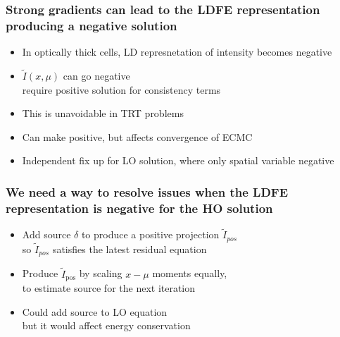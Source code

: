 \documentclass[xcolor=dvipsnames,hyperref={pdfpagelabels=false},unknownkeysallowed]{beamer}
\newcommand{\colb}[1]{{\color{blue} #1}}
\newcommand{\colG}[1]{{\color{Gray!110} #1}}
\newlength{\wideitemsep}
\let\olditem\item
\renewcommand{\item}{\setlength{\itemsep}{\wideitemsep}\olditem}
\newcommand{\B}[1]{\ensuremath{\mathbf{#1}}}
\begin{document}
\begin{frame}
    \frametitle{Strong gradients can lead to the LDFE representation producing a negative solution}
    \begin{itemize}
        \item[] In optically thick cells, LD represnetation of intensity becomes negative
        \item[] $\tilde I(x,\mu)$ can go negative \\ \colG{require positive solution for consistency terms}
        \item[] This is unavoidable in TRT problems
         \item[] Can make positive, but affects convergence of ECMC
         \item[] Independent fix up for LO solution, where only spatial variable negative
    \end{itemize}

\end{frame}

\begin{frame}
    \frametitle{We need a way to resolve issues when the LDFE representation is
        negative for the HO solution }
    \begin{itemize} 
        \item[] Add source $\delta$ to produce a positive projection $\tilde I_{pos}$ \\ \colG{so $\tilde I_{pos}$ satisfies the
    latest residual equation}
            \vspace{0.1in}
        \item[] Produce $\tilde I_{\text{pos}}$ by scaling $x-\mu$ moments equally,
            \\ \colG{to estimate source for the next iteration}
        \item[] Could add source to LO equation \\ \colG{but it would affect energy conservation}
    \end{itemize}

\end{frame}
\end{document}
